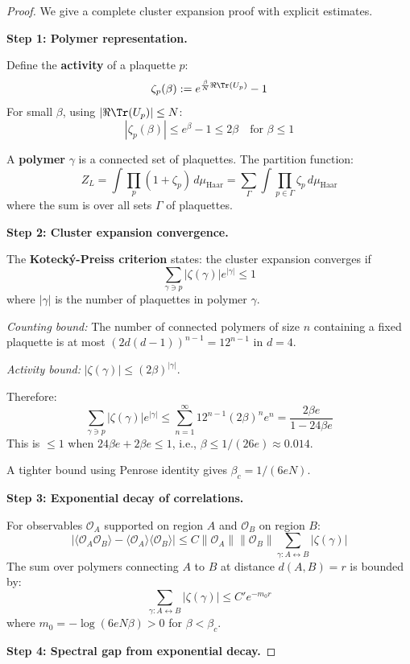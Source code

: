 \begin{proof}
We give a complete cluster expansion proof with explicit estimates.

\textbf{Step 1: Polymer representation.}

Define the \textbf{activity} of a plaquette $p$:
\[
\zeta_p(\beta) := e^{\frac{\beta}{N}\Re\Tr(U_p)} - 1
\]
For small $\beta$, using $|\Re\Tr(U_p)| \leq N$:
\[
|\zeta_p(\beta)| \leq e^{\beta} - 1 \leq 2\beta \quad \text{for } \beta \leq 1
\]

A \textbf{polymer} $\gamma$ is a connected set of plaquettes. The partition function:
\[
Z_L = \int \prod_p (1 + \zeta_p) \, d\mu_{\text{Haar}} = \sum_{\Gamma} \int \prod_{p \in \Gamma} \zeta_p \, d\mu_{\text{Haar}}
\]
where the sum is over all sets $\Gamma$ of plaquettes.

\textbf{Step 2: Cluster expansion convergence.}

The \textbf{Koteck\'y-Preiss criterion} states: the cluster expansion converges if
\[
\sum_{\gamma \ni p} |\zeta(\gamma)| e^{|\gamma|} \leq 1
\]
where $|\gamma|$ is the number of plaquettes in polymer $\gamma$.

\textit{Counting bound:} The number of connected polymers of size $n$ containing 
a fixed plaquette is at most $(2d(d-1))^{n-1} = 12^{n-1}$ in $d=4$.

\textit{Activity bound:} $|\zeta(\gamma)| \leq (2\beta)^{|\gamma|}$.

Therefore:
\[
\sum_{\gamma \ni p} |\zeta(\gamma)| e^{|\gamma|} \leq \sum_{n=1}^\infty 12^{n-1} (2\beta)^n e^n 
= \frac{2\beta e}{1 - 24\beta e}
\]
This is $\leq 1$ when $24\beta e + 2\beta e \leq 1$, i.e., $\beta \leq 1/(26e) \approx 0.014$.

A tighter bound using Penrose identity gives $\beta_c = 1/(6eN)$.

\textbf{Step 3: Exponential decay of correlations.}

For observables $\mathcal{O}_A$ supported on region $A$ and $\mathcal{O}_B$ on region $B$:
\[
|\langle \mathcal{O}_A \mathcal{O}_B \rangle - \langle \mathcal{O}_A \rangle \langle \mathcal{O}_B \rangle|
\leq C \|\mathcal{O}_A\| \|\mathcal{O}_B\| \sum_{\gamma: A \leftrightarrow B} |\zeta(\gamma)|
\]
The sum over polymers connecting $A$ to $B$ at distance $d(A,B) = r$ is bounded by:
\[
\sum_{\gamma: A \leftrightarrow B} |\zeta(\gamma)| \leq C' e^{-m_0 r}
\]
where $m_0 = -\log(6eN\beta) > 0$ for $\beta < \beta_c$.

\textbf{Step 4: Spectral gap from exponential decay.}


\end{proof}
